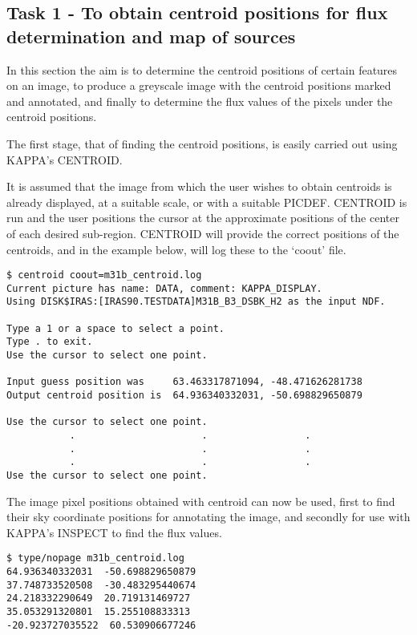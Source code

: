 \subsection {Task 1  - To obtain centroid positions for flux determination and 
map of sources}
\label{a:exkappa1}
In this section the aim is to determine the centroid positions of certain
features on an image, to produce a greyscale image with the centroid positions
marked and annotated, and finally to determine the flux values of the pixels
under the centroid positions.

The first stage, that of finding the centroid positions, is easily carried out
using KAPPA's CENTROID. 

It is assumed that the image from which the user wishes to obtain centroids is
already displayed, at a suitable scale, or with a suitable PICDEF. CENTROID is
run and the user positions the cursor at the approximate positions of
the center of each desired sub-region. CENTROID will provide the correct
positions of the centroids, and in the example below, will log these to the
`coout' file.
\begin{small}
\begin{verbatim}
$ centroid coout=m31b_centroid.log
Current picture has name: DATA, comment: KAPPA_DISPLAY.
Using DISK$IRAS:[IRAS90.TESTDATA]M31B_B3_DSBK_H2 as the input NDF.

Type a 1 or a space to select a point.
Type . to exit.
Use the cursor to select one point.

Input guess position was     63.463317871094, -48.471626281738
Output centroid position is  64.936340332031, -50.698829650879

Use the cursor to select one point.
           .                      .                 .
           .                      .                 .
           .                      .                 .
Use the cursor to select one point.
\end{verbatim}
\end{small}

The image pixel positions obtained with centroid can now be used, first to
find their sky coordinate positions for annotating the image, and secondly
for use with KAPPA's INSPECT to find the flux values.
\begin{small}
\begin{verbatim}
$ type/nopage m31b_centroid.log
64.936340332031  -50.698829650879  
37.748733520508  -30.483295440674  
24.218332290649  20.719131469727  
35.053291320801  15.255108833313  
-20.923727035522  60.530906677246  
\end{verbatim}
\end{small}

